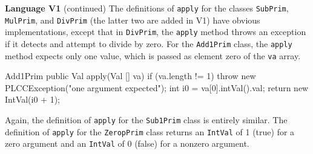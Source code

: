 \begin{minipage}[t]{\sw}
\slidenumber
\LARGE
{\bf Language V1} (continued)\exx
The definitions of \verb'apply' for the classes
\verb'SubPrim', \verb'MulPrim', and \verb'DivPrim'
(the latter two are added in V1)
have obvious implementations, except that in \verb'DivPrim',
the \verb'apply' method throws an exception
if it detects and attempt to divide by zero.\exx
For the \verb'Add1Prim' class,
the \verb'apply' method expects only one value,
which is passed as element zero of the \verb'va' array.
{\Large
\begin{qv}
Add1Prim
    public Val apply(Val [] va) {
        if (va.length != 1)
            throw new PLCCException("one argument expected");
        int i0 = va[0].intVal().val;
        return new IntVal(i0 + 1);
    }
\end{qv}
}
Again, the definition of \verb'apply' for the \verb'Sub1Prim' class
is entirely similar.
The definition of \verb'apply' for the \verb'ZeropPrim' class
returns an \verb'IntVal' of 1 (true) for a zero argument
and an \verb'IntVal' of 0 (false) for a nonzero argument.
\end{minipage}
\clearpage
